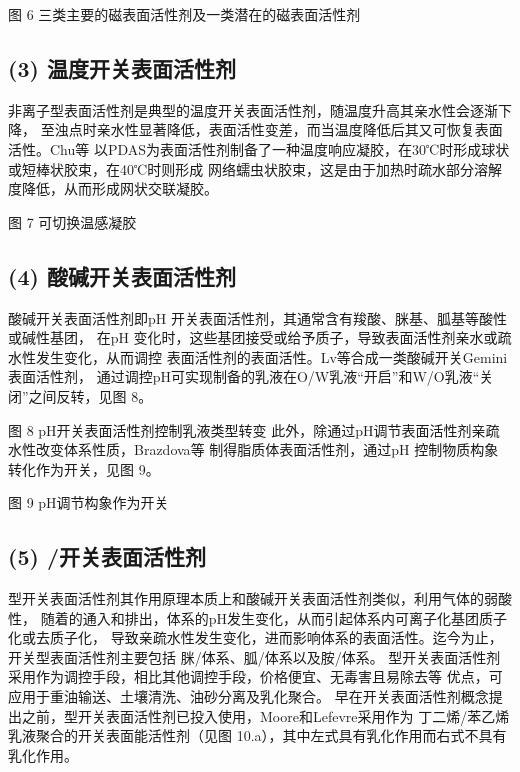\documentclass[bachelor,fandolfonts,replaceperiod]{jnuthesis} %
\begin{document}
    图 6 三类主要的磁表面活性剂及一类潜在的磁表面活性剂\cite{brown2015,brown2012}
    
    \subsection*{(3) 温度开关表面活性剂}
    非离子型表面活性剂是典型的温度开关表面活性剂，随温度升高其亲水性会逐渐下降，
    至浊点时亲水性显著降低，表面活性变差，而当温度降低后其又可恢复表面活性。Chu\cite{chu2011}等
    以PDAS为表面活性剂制备了一种温度响应凝胶，在30℃时形成球状或短棒状胶束，在40℃时则形成
    网络蠕虫状胶束，这是由于加热时疏水部分溶解度降低，从而形成网状交联凝胶。
    
    图 7 可切换温感凝胶
    \subsection*{(4) 酸碱开关表面活性剂}
    酸碱开关表面活性剂即pH 开关表面活性剂，其通常含有羧酸、脒基、胍基等酸性或碱性基团，
    在pH 变化时，这些基团接受或给予质子，导致表面活性剂亲水或疏水性发生变化，从而调控
    表面活性剂的表面活性\cite{吕湘亮2018}。Lv\cite{lv2014}等合成一类酸碱开关Gemini表面活性剂，
    通过调控pH可实现制备的乳液在O/W乳液“开启”和W/O乳液“关闭”之间反转，见图 8。
    
    图 8 pH开关表面活性剂控制乳液类型转变
    此外，除通过pH调节表面活性剂亲疏水性改变体系性质，Brazdova\cite{李云霞2011,brazdova2008}等
    制得脂质体表面活性剂，通过pH 控制物质构象转化作为开关，见图 9。
    
    图 9 pH调节构象作为开关
    \subsection*{(5) /开关表面活性剂}
    型开关表面活性剂其作用原理本质上和酸碱开关表面活性剂类似，利用气体的弱酸性，
    随着的通入和排出，体系的pH发生变化，从而引起体系内可离子化基团质子化或去质子化，
    导致亲疏水性发生变化，进而影响体系的表面活性。迄今为止，开关型表面活性剂主要包括
    脒/体系、胍/体系以及胺/体系\cite{梅平2016}。
    型开关表面活性剂采用作为调控手段，相比其他调控手段，价格便宜、无毒害且易除去等
    优点\cite{jessop2012}，可应用于重油输送、土壤清洗、油砂分离及乳化聚合\cite{jessop2012}。
    早在开关表面活性剂概念提出之前，型开关表面活性剂已投入使用，Moore和Lefevre采用作为
    丁二烯/苯乙烯乳液聚合的开关表面能活性剂（见图 10.a），其中左式具有乳化作用而右式不具有乳化作用。
    
\end{document}
